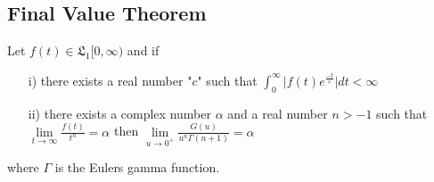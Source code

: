 \subsection{Final Value Theorem}
\begin{theorem}
Let $ f(t)\in \mathfrak{L}_{1}[0,\infty) $ and if
\begin{enumerate}
\item[i)]there exists a real number "$c$" such that $\int_{0}^{\infty}\vert f(t)e^{\frac{-t}{c}} \vert dt < \infty $ 
\item[ii)]there exists a complex number $ \alpha $ and a real number $ n>-1 $ such that\\
$\underset{t\rightarrow \infty}\lim \frac{f(t)}{t^{n}}=\alpha$ then
$\underset{u\rightarrow 0^{+}}\lim \frac{G(u)}{u^{n}\Gamma(n+1)}=\alpha$
\end{enumerate}
where $\Gamma $ is the Eulers gamma function.
\end{theorem}
